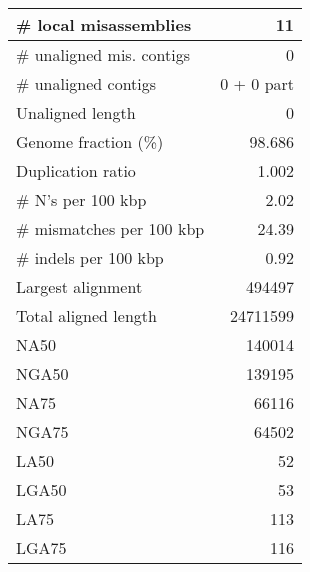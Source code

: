 \documentclass[12pt,a4paper]{article}
\begin{document}
\begin{table}[ht]
\begin{center}
\begin{tabular}{|l*{1}{|r}|}
\# local misassemblies & 11 \\ \hline
\# unaligned mis. contigs & 0 \\ \hline
\# unaligned contigs & 0 + 0 part \\ \hline
Unaligned length & 0 \\ \hline
Genome fraction (\%) & 98.686 \\ \hline
Duplication ratio & 1.002 \\ \hline
\# N's per 100 kbp & 2.02 \\ \hline
\# mismatches per 100 kbp & 24.39 \\ \hline
\# indels per 100 kbp & 0.92 \\ \hline
Largest alignment & 494497 \\ \hline
Total aligned length & 24711599 \\ \hline
NA50 & 140014 \\ \hline
NGA50 & 139195 \\ \hline
NA75 & 66116 \\ \hline
NGA75 & 64502 \\ \hline
LA50 & 52 \\ \hline
LGA50 & 53 \\ \hline
LA75 & 113 \\ \hline
LGA75 & 116 \\ \hline
\end{tabular}
\end{center}
\end{table}
\end{document}
